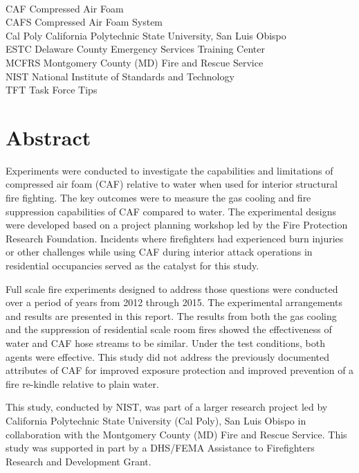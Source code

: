\documentclass[12pt,oneside]{book}
\begin{document}
\begin{tabbing}
\hspace{1.5in} \= \\
CAF \> Compressed Air Foam \\
CAFS \> Compressed Air Foam System \\
Cal Poly \> California Polytechnic State University, San Luis Obispo \\
ESTC \> Delaware County Emergency Services Training Center \\
MCFRS \> Montgomery County (MD) Fire and Rescue Service \\
NIST \> National Institute of Standards and Technology \\
TFT \> Task Force Tips \\
\end{tabbing}

\mainmatter

\chapter*{\centering Abstract}

Experiments were conducted to investigate the capabilities and limitations of compressed air foam (CAF) relative to water when used for interior structural fire fighting. The key outcomes were to measure the gas cooling and fire suppression capabilities of CAF compared to water. The experimental designs were developed based on a project planning workshop led by the Fire Protection Research Foundation. Incidents where firefighters had experienced burn injuries or other challenges while using CAF during interior attack operations in residential occupancies served as the catalyst for this study.

Full scale fire experiments designed to address those questions were conducted over a period of years from 2012 through 2015. The experimental arrangements and results are presented in this report. The results from both the gas cooling and the suppression of residential scale room fires showed the effectiveness of water and CAF hose streams to be similar. Under the test conditions, both agents were effective. This study did not address the previously documented attributes of CAF for improved exposure protection and improved prevention of a fire re-kindle relative to plain water. 

This study, conducted by NIST, was part of a larger research project led by California Polytechnic State University (Cal Poly), San Luis Obispo in collaboration with the Montgomery County (MD) Fire and Rescue Service.  This study was supported in part by a DHS/FEMA Assistance to Firefighters Research and Development Grant.
\end{document}
